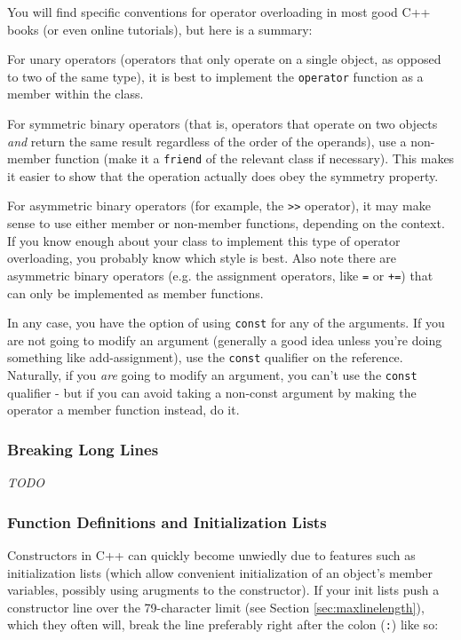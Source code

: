 \documentclass[12pt]{article}
\newcommand{\code}[1]{\texttt{#1}}
\begin{document}
You will find specific conventions for operator overloading in most good C++ books (or even online tutorials), but here is a summary:

For unary operators (operators that only operate on a single object, as opposed to two of the same type), it is best to implement the \texttt{operator} function as a member within the class.

For symmetric binary operators (that is, operators that operate on two objects \emph{and} return the same result regardless of the order of the operands), use a non-member function (make it a \texttt{friend} of the relevant class if necessary). This makes it easier to show that the operation actually does obey the symmetry property.

For asymmetric binary operators (for example, the \texttt{>{}>} operator), it may make sense to use either member or non-member functions, depending on the context. If you know enough about your class to implement this type of operator overloading, you probably know which style is best. Also note there are asymmetric binary operators (e.g. the assignment operators, like \texttt{=} or \texttt{+=}) that can only be implemented as member functions.

In any case, you have the option of using \texttt{const} for any of the arguments. If you are not going to modify an argument (generally a good idea unless you're doing something like add-assignment), use the \texttt{const} qualifier on the reference. Naturally, if you \emph{are} going to modify an argument, you can't use the \texttt{const} qualifier - but if you can avoid taking a non-const argument by making the operator a member function instead, do it.

\subsubsection{Breaking Long Lines}
\label{sec:ccpp-linebreak}
\textit{TODO}
\subsubsection{Function Definitions and Initialization Lists}
Constructors in C++ can quickly become unwiedly due to features such as initialization lists (which allow convenient initialization of an object's member variables, possibly using arugments to the constructor). If your init lists push a constructor line over the 79-character limit (see Section \ref{sec:maxlinelength}), which they often will, break the line preferably right after the colon (\code{:}) like so:
\begin{codeex}
VisionPacket::VisionPacket(vector<Mat> lineContours, Matx33f perspTrans) :
        lineContours(lineContours), perspTrans(perspTrans) {
    linesGround.resize(lineContours.size());
    sortByLength();
    ...
\end{codeex}
\end{document}
